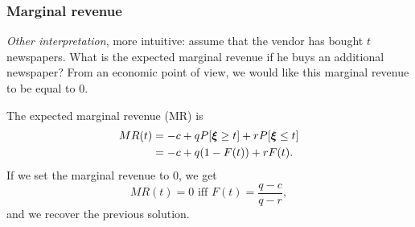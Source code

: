 \documentclass[aspectratio=169]{beamer}
\begin{document}
\begin{frame}
\frametitle{Marginal revenue}

{\textsl{Other interpretation}}, more intuitive: assume that the vendor has bought $t$ newspapers.
What is the expected marginal revenue if he buys an additional newspaper?
From an economic point of view, we would like this marginal revenue to be equal to 0.

\mbox{}

The expected marginal revenue (MR) is
\begin{align*}
MR(t) &= -c + qP[{\boldsymbol{\xi}} \geq t] + rP[{\boldsymbol{\xi}} \leq t]\\
&= -c + q(1-F(t)) + rF(t).
\end{align*}
If we set the marginal revenue to 0, we get
$$
MR(t) = 0 \mbox{ iff } F(t) = \frac{q-c}{q-r},
$$
and we recover the previous solution.


\end{frame}
\end{document}

